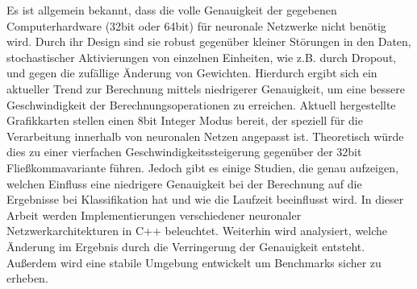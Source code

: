 Es ist allgemein bekannt, dass die volle Genauigkeit der gegebenen Computerhardware (32bit oder 64bit) für neuronale Netzwerke nicht benötig wird. Durch ihr Design sind sie robust gegenüber kleiner Störungen in den Daten, stochastischer Aktivierungen von einzelnen Einheiten, wie z.B. durch Dropout, und gegen die zufällige Änderung von Gewichten. Hierdurch ergibt sich ein aktueller Trend zur Berechnung mittels niedrigerer Genauigkeit, um eine bessere Geschwindigkeit der Berechnungsoperationen zu erreichen. Aktuell hergestellte Grafikkarten stellen einen 8bit Integer Modus bereit, der speziell für die Verarbeitung innerhalb von neuronalen Netzen angepasst ist. Theoretisch würde dies zu einer vierfachen Geschwindigkeitssteigerung gegenüber der 32bit Fließkommavariante führen. Jedoch gibt es einige Studien, die genau aufzeigen, welchen Einfluss eine niedrigere Genauigkeit bei der Berechnung auf die Ergebnisse bei Klassifikation hat und wie die Laufzeit beeinflusst wird. In dieser Arbeit werden Implementierungen verschiedener neuronaler Netzwerkarchitekturen in C++ beleuchtet. Weiterhin wird analysiert, welche Änderung im Ergebnis durch die Verringerung der Genauigkeit entsteht. Außerdem wird eine stabile Umgebung entwickelt um Benchmarks sicher zu erheben.